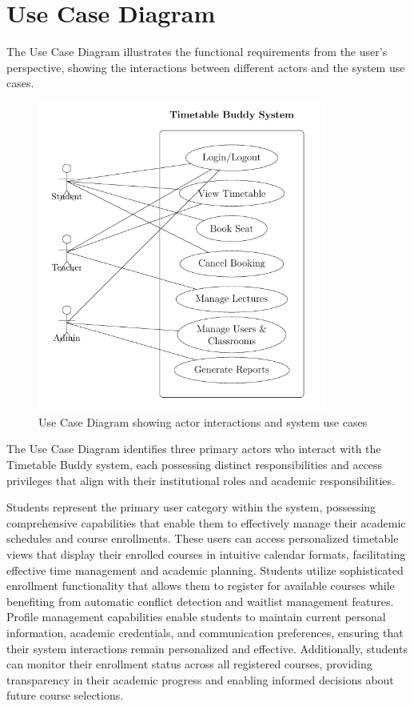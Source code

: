 \section{Use Case Diagram}

The Use Case Diagram illustrates the functional requirements from the user's perspective, showing the interactions between different actors and the system use cases.

\begin{figure}[htbp]
    \centering
    \includegraphics[width=0.85\textwidth]{images/Usecase diagram.png}
    \caption{Use Case Diagram showing actor interactions and system use cases}
    \label{fig:usecase}
\end{figure}

The Use Case Diagram identifies three primary actors who interact with the Timetable Buddy system, each possessing distinct responsibilities and access privileges that align with their institutional roles and academic responsibilities.

Students represent the primary user category within the system, possessing comprehensive capabilities that enable them to effectively manage their academic schedules and course enrollments. These users can access personalized timetable views that display their enrolled courses in intuitive calendar formats, facilitating effective time management and academic planning. Students utilize sophisticated enrollment functionality that allows them to register for available courses while benefiting from automatic conflict detection and waitlist management features. Profile management capabilities enable students to maintain current personal information, academic credentials, and communication preferences, ensuring that their system interactions remain personalized and effective. Additionally, students can monitor their enrollment status across all registered courses, providing transparency in their academic progress and enabling informed decisions about future course selections.

